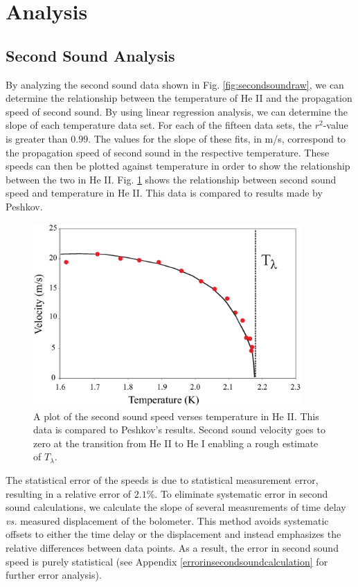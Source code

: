 
\section{Analysis}\label{analysis}
\subsection{Second Sound Analysis}\label{secondsoundanalysis}

By analyzing the second sound data shown in Fig. \ref{fig:secondsoundraw}, we can determine the relationship between the temperature of He II and the propagation speed of second sound.  By using linear regression analysis, we can determine the slope of each temperature data set.  For each of the fifteen data sets, the $r^{2}$-value is greater than $0.99$.  The values for the slope of these fits, in m/s, correspond to the propagation speed of second sound in the respective temperature.  These speeds can then be plotted against temperature in order to show the relationship between the two in He II.  Fig. \ref{fig:secondsound} shows the relationship between second sound speed and temperature in He II.  This data is compared to results made by Peshkov.\cite{peshkov}
\begin{figure}[htbp]
\begin{center}
\includegraphics[height=70mm]{./figures/secondsound.eps}
\caption{\small{A plot of the second sound speed verses temperature in He II.  This data is compared to Peshkov's results.\cite{peshkov} Second sound velocity goes to zero at the transition from He II to He I enabling a rough estimate of $T_{\lambda}$.}}
\label{fig:secondsound}
\end{center}
\end{figure}

The statistical error of the speeds is due to statistical measurement error, resulting in a relative error of $2.1\%$. To eliminate systematic error in second sound calculations, we calculate the slope of several measurements of time delay \emph{vs.} measured displacement of the bolometer. This method avoids systematic offsets to either the time delay or the displacement and instead emphasizes the relative differences between data points. As a result, the error in second sound speed is purely statistical (see Appendix \ref{errorinsecondsoundcalculation} for further error analysis).


